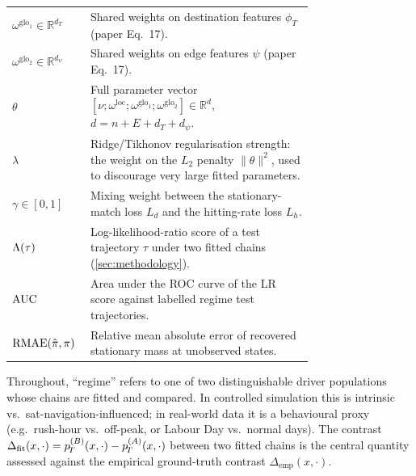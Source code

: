 \begin{table}[H]
\begin{tabular}{@{}lp{0.74\linewidth}@{}}
$\omega^{\mathrm{glo}_1} \in \mathbb{R}^{d_T}$ & Shared weights on destination features $\phi_T$ (paper Eq.~17). \\
$\omega^{\mathrm{glo}_2} \in \mathbb{R}^{d_\psi}$ & Shared weights on edge features $\psi$ (paper Eq.~17). \\
$\theta$ & Full parameter vector $[\nu;\omega^{\mathrm{loc}};\omega^{\mathrm{glo}_1};\omega^{\mathrm{glo}_2}] \in \mathbb{R}^{d}$, $d = n + E + d_T + d_\psi$. \\
$\lambda$ & Ridge/Tikhonov regularisation strength: the weight on the
$L_2$ penalty $\|\theta\|^2$, used to discourage very large fitted
parameters. \\
$\gamma \in [0,1]$ & Mixing weight between the stationary-match loss $L_d$ and the hitting-rate loss $L_h$. \\
$\Lambda(\tau)$ & Log-likelihood-ratio score of a test trajectory $\tau$ under two fitted chains (\cref{sec:methodology}). \\
$\mathrm{AUC}$ & Area under the ROC curve of the LR score against labelled regime test trajectories. \\
$\mathrm{RMAE}(\hat{\pi},\pi)$ & Relative mean absolute error of recovered stationary mass at unobserved states. \\
\bottomrule
\end{tabular}
\end{table}

Throughout, ``regime'' refers to one of two distinguishable driver
populations whose chains are fitted and compared. In controlled simulation
this is intrinsic vs.\ sat-navigation-influenced; in real-world data it
is a behavioural proxy (e.g.\ rush-hour vs.\ off-peak, or Labour Day
vs.\ normal days). The contrast
$\Delta_{\mathrm{fit}}(x, \cdot) = p_{\!T}^{(B)}(x,\cdot) - p_{\!T}^{(A)}(x,\cdot)$
between two fitted chains is the central quantity assessed against the
empirical ground-truth contrast
$\Delta_{\mathrm{emp}}(x, \cdot)$.
